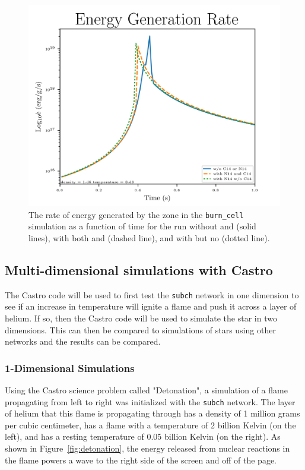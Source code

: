 \documentclass[preprint]{aastex62}
\begin{document}
      \begin{figure}
        \centering
        \includegraphics[width=5in]{images/subch_nC14nN14_edot_tol-10.png}
        \caption{The rate of energy generated by the zone in the {\tt burn\_cell} simulation as a function of time for the run without  and  (solid lines), with both  and  (dashed line), and with  but no  (dotted line).
          }
        \label{fig:energygeneration}
      \end{figure} 
      
\newpage
  
  \subsection{Multi-dimensional simulations with Castro}
  
    The Castro code will be used to first test the {\tt subch} network in one dimension to see if an increase in temperature will ignite a flame and push it across a layer of helium. If so, then the Castro code will be used to simulate the star in two dimensions. This can then be compared to simulations of stars using other networks and the results can be compared. 
    
    \subsubsection{1-Dimensional Simulations}
    
      Using the Castro science problem called "Detonation", a simulation of a flame propagating from left to right was initialized with the {\tt subch} network. The layer of helium that this flame is propagating through has a density of 1 million grams per cubic centimeter, has a flame with a temperature of 2 billion Kelvin (on the left), and has a resting temperature of 0.05 billion Kelvin (on the right). As shown in Figure~\ref{fig:detonation}, the energy released from nuclear reactions in the flame powers a wave to the right side of the screen and off of the page. 
      
\end{document}
